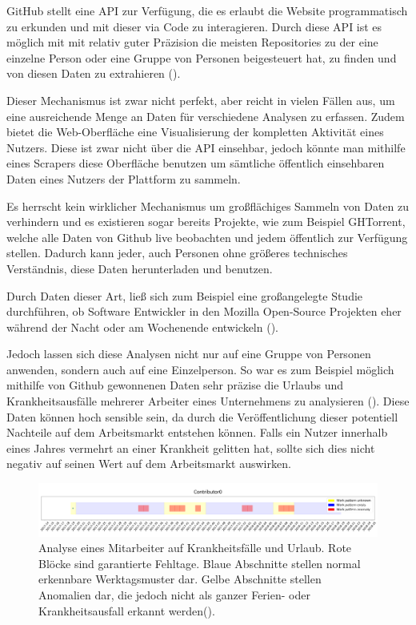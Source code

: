 \documentclass[12pt,a4paper]{article}
\begin{document}
GitHub stellt eine API zur Verfügung, die es erlaubt die Website programmatisch zu erkunden und mit dieser via Code zu interagieren.
Durch diese API ist es möglich mit mit relativ guter Präzision die meisten Repositories zu der eine einzelne Person oder eine Gruppe von Personen beigesteuert hat, zu finden und von diesen Daten zu extrahieren (\cite[p.~14-16]{thes:thesis}).

Dieser Mechanismus ist zwar nicht perfekt, aber reicht in vielen Fällen aus, um eine ausreichende Menge an Daten für verschiedene Analysen zu erfassen.
Zudem bietet die Web-Oberfläche eine Visualisierung der kompletten Aktivität eines Nutzers.
Diese ist zwar nicht über die API einsehbar, jedoch könnte man mithilfe eines Scrapers diese Oberfläche benutzen um sämtliche öffentlich einsehbaren Daten eines Nutzers der Plattform zu sammeln.

Es herrscht kein wirklicher Mechanismus um großflächiges Sammeln von Daten zu verhindern und es existieren sogar bereits Projekte, wie zum Beispiel GHTorrent, welche alle Daten von Github live beobachten und jedem öffentlich zur Verfügung stellen.
Dadurch kann jeder, auch Personen ohne größeres technisches Verständnis, diese Daten herunterladen und benutzen.

Durch Daten dieser Art, ließ sich zum Beispiel eine großangelegte Studie durchführen, ob Software Entwickler in den Mozilla Open-Source Projekten eher während der Nacht oder am Wochenende entwickeln (\cite{inproc:work-night}).

Jedoch lassen sich diese Analysen nicht nur auf eine Gruppe von Personen anwenden, sondern auch auf eine Einzelperson.
So war es zum Beispiel möglich mithilfe von Github gewonnenen Daten sehr präzise die Urlaubs und Krankheitsausfälle mehrerer Arbeiter eines Unternehmens zu analysieren (\cite[p.~37-39]{thes:thesis}).
Diese Daten können hoch sensible sein, da durch die Veröffentlichung dieser potentiell Nachteile auf dem Arbeitsmarkt entstehen können.
Falls ein Nutzer innerhalb eines Jahres vermehrt an einer Krankheit gelitten hat, sollte sich dies nicht negativ auf seinen Wert auf dem Arbeitsmarkt auswirken.

\begin{figure}[H]
    \includegraphics[scale=0.17]{./gfx/krankheit.png}
    \centering
    \caption{Analyse eines Mitarbeiter auf Krankheitsfälle und Urlaub.
    Rote Blöcke sind garantierte Fehltage.
    Blaue Abschnitte stellen normal erkennbare Werktagsmuster dar.
    Gelbe Abschnitte stellen Anomalien dar, die jedoch nicht als ganzer Ferien- oder Krankheitsausfall erkannt werden(\cite[p.~37-39]{thes:thesis}).}\label{fig:git-history}
\end{figure}
\end{document}
